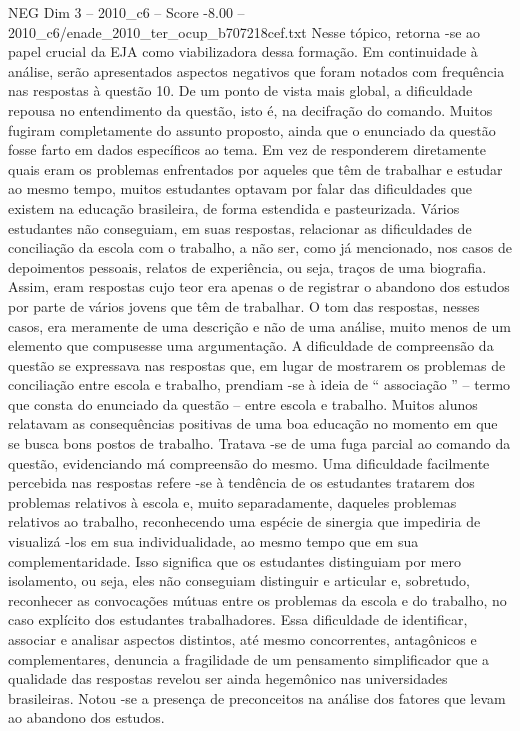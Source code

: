 \begin{textsample}{NEG Dim 3 – 2010\_c6 – Score -8.00 – 2010\_c6/enade\_2010\_ter\_ocup\_b707218cef.txt}
Nesse tópico, retorna -se ao papel crucial da EJA como viabilizadora dessa formação.
Em continuidade à análise, serão apresentados aspectos negativos que foram notados com frequência nas respostas à questão 10.
De um ponto de vista mais global, a dificuldade repousa no entendimento da questão, isto é, na decifração do comando.
Muitos fugiram completamente do assunto proposto, ainda que o enunciado da questão fosse farto em dados específicos ao tema.
Em vez de responderem diretamente quais eram os problemas enfrentados por aqueles que têm de trabalhar e estudar ao mesmo tempo, muitos estudantes optavam por falar das dificuldades que existem na educação brasileira, de forma estendida e pasteurizada.
Vários estudantes não conseguiam, em suas respostas, relacionar as dificuldades de conciliação da escola com o trabalho, a não ser, como já mencionado, nos casos de depoimentos pessoais, relatos de experiência, ou seja, traços de uma biografia.
Assim, eram respostas cujo teor era apenas o de registrar o abandono dos estudos por parte de vários jovens que têm de trabalhar.
O tom das respostas, nesses casos, era meramente de uma descrição e não de uma análise, muito menos de um elemento que compusesse uma argumentação.
A dificuldade de compreensão da questão se expressava nas respostas que, em lugar de mostrarem os problemas de conciliação entre escola e trabalho, prendiam -se à ideia de “ associação ” – termo que consta do enunciado da questão – entre escola e trabalho.
Muitos alunos relatavam as consequências positivas de uma boa educação no momento em que se busca bons postos de trabalho.
Tratava -se de uma fuga parcial ao comando da questão, evidenciando má compreensão do mesmo.
Uma dificuldade facilmente percebida nas respostas refere -se à tendência de os estudantes tratarem dos problemas relativos à escola e, muito separadamente, daqueles problemas relativos ao trabalho, reconhecendo uma espécie de sinergia que impediria de visualizá -los em sua individualidade, ao mesmo tempo que em sua complementaridade.
Isso significa que os estudantes distinguiam por mero isolamento, ou seja, eles não conseguiam distinguir e articular e, sobretudo, reconhecer as convocações mútuas entre os problemas da escola e do trabalho, no caso explícito dos estudantes trabalhadores.
Essa dificuldade de identificar, associar e analisar aspectos distintos, até mesmo concorrentes, antagônicos e complementares, denuncia a fragilidade de um pensamento simplificador que a qualidade das respostas revelou ser ainda hegemônico nas universidades brasileiras.
Notou -se a presença de preconceitos na análise dos fatores que levam ao abandono dos estudos.

\end{textsample}
